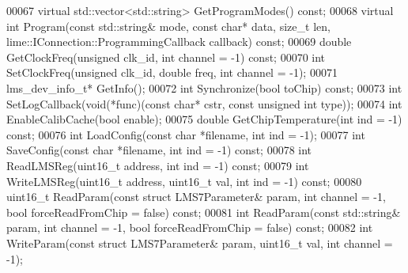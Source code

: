 \begin{DoxyCode}
00067     \textcolor{keyword}{virtual} std::vector<std::string> GetProgramModes() \textcolor{keyword}{const};
00068     \textcolor{keyword}{virtual} \textcolor{keywordtype}{int} Program(\textcolor{keyword}{const} std::string& mode, \textcolor{keyword}{const} \textcolor{keywordtype}{char}* data, \textcolor{keywordtype}{size\_t} len, 
      lime::IConnection::ProgrammingCallback callback) \textcolor{keyword}{const};
00069     \textcolor{keywordtype}{double} GetClockFreq(\textcolor{keywordtype}{unsigned} clk_id, \textcolor{keywordtype}{int} channel = -1) \textcolor{keyword}{const};
00070     \textcolor{keywordtype}{int} SetClockFreq(\textcolor{keywordtype}{unsigned} clk_id, \textcolor{keywordtype}{double} freq, \textcolor{keywordtype}{int} channel = -1);
00071     lms_dev_info_t* GetInfo();
00072     \textcolor{keywordtype}{int} Synchronize(\textcolor{keywordtype}{bool} toChip) \textcolor{keyword}{const};
00073     \textcolor{keywordtype}{int} SetLogCallback(\textcolor{keywordtype}{void}(*func)(\textcolor{keyword}{const} \textcolor{keywordtype}{char}* cstr, \textcolor{keyword}{const} \textcolor{keywordtype}{unsigned} \textcolor{keywordtype}{int} type));
00074     \textcolor{keywordtype}{int} EnableCalibCache(\textcolor{keywordtype}{bool} enable);
00075     \textcolor{keywordtype}{double} GetChipTemperature(\textcolor{keywordtype}{int} ind = -1) \textcolor{keyword}{const};
00076     \textcolor{keywordtype}{int} LoadConfig(\textcolor{keyword}{const} \textcolor{keywordtype}{char} *filename, \textcolor{keywordtype}{int} ind = -1);
00077     \textcolor{keywordtype}{int} SaveConfig(\textcolor{keyword}{const} \textcolor{keywordtype}{char} *filename, \textcolor{keywordtype}{int} ind = -1) \textcolor{keyword}{const};
00078     \textcolor{keywordtype}{int} ReadLMSReg(uint16\_t address, \textcolor{keywordtype}{int} ind = -1) \textcolor{keyword}{const};
00079     \textcolor{keywordtype}{int} WriteLMSReg(uint16\_t address, uint16\_t val, \textcolor{keywordtype}{int} ind = -1) \textcolor{keyword}{const};
00080     uint16\_t ReadParam(\textcolor{keyword}{const} \textcolor{keyword}{struct} LMS7Parameter& param, \textcolor{keywordtype}{int} channel = -1, \textcolor{keywordtype}{bool} forceReadFromChip = \textcolor{keyword}{false})
       \textcolor{keyword}{const};
00081     \textcolor{keywordtype}{int} ReadParam(\textcolor{keyword}{const} std::string& param, \textcolor{keywordtype}{int} channel = -1, \textcolor{keywordtype}{bool} forceReadFromChip = \textcolor{keyword}{false}) \textcolor{keyword}{const};
00082     \textcolor{keywordtype}{int} WriteParam(\textcolor{keyword}{const} \textcolor{keyword}{struct} LMS7Parameter& param, uint16\_t val, \textcolor{keywordtype}{int} channel = -1);

\end{DoxyCode}
